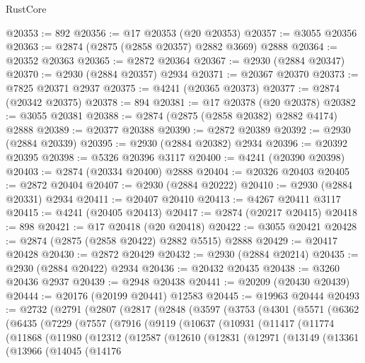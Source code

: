\begin{lexlean}{RustCore}
\begin{coremodule}
@20353 := 892
@20356 := @17 @20353 (@20 @20353)
@20357 := @3055 @20356
@20363 := @2874 (@2875 (@2858 @20357) @2882 @3669) @2888
@20364 := @20352 @20363
@20365 := @2872 @20364
@20367 := @2930 (@2884 @20347)
@20370 := @2930 (@2884 @20357) @2934
@20371 := @20367 @20370
@20373 := @7825 @20371 @2937
@20375 := @4241 (@20365 @20373)
@20377 := @2874 (@20342 @20375)
@20378 := 894
@20381 := @17 @20378 (@20 @20378)
@20382 := @3055 @20381
@20388 := @2874 (@2875 (@2858 @20382) @2882 @4174) @2888
@20389 := @20377 @20388
@20390 := @2872 @20389
@20392 := @2930 (@2884 @20339)
@20395 := @2930 (@2884 @20382) @2934
@20396 := @20392 @20395
@20398 := @5326 @20396 @3117
@20400 := @4241 (@20390 @20398)
@20403 := @2874 (@20334 @20400) @2888
@20404 := @20326 @20403
@20405 := @2872 @20404
@20407 := @2930 (@2884 @20222)
@20410 := @2930 (@2884 @20331) @2934
@20411 := @20407 @20410
@20413 := @4267 @20411 @3117
@20415 := @4241 (@20405 @20413)
@20417 := @2874 (@20217 @20415)
@20418 := 898
@20421 := @17 @20418 (@20 @20418)
@20422 := @3055 @20421
@20428 := @2874 (@2875 (@2858 @20422) @2882 @5515) @2888
@20429 := @20417 @20428
@20430 := @2872 @20429
@20432 := @2930 (@2884 @20214)
@20435 := @2930 (@2884 @20422) @2934
@20436 := @20432 @20435
@20438 := @3260 @20436 @2937
@20439 := @2948 @20438
@20441 := @20209 (@20430 @20439)
@20444 := @20176 (@20199 @20441) @12583
@20445 := @19963 @20444
@20493 := @2732
    (@2791
      (@2807
        (@2817
          (@2848
            (@3597
              (@3753
                (@4301
                  (@5571
                    (@6362
                      (@6435
                        (@7229
                          (@7557
                            (@7916
                              (@9119
                                (@10637
                                  (@10931
                                    (@11417
                                      (@11774
                                        (@11868
                                          (@11980
                                            (@12312
                                              (@12587
                                                (@12610
                                                  (@12831
                                                    (@12971
                                                      (@13149
                                                        (@13361
                                                          (@13966
                                                            (@14045
                                                              (@14176

\end{coremodule}
\end{lexlean}
